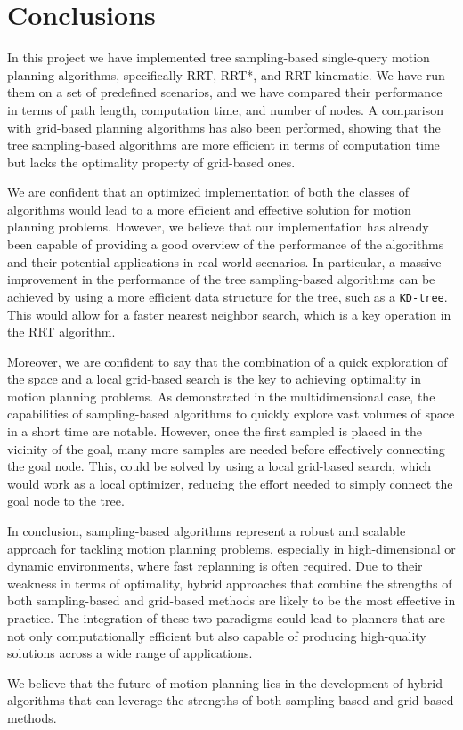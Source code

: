 \section{Conclusions}
\label{sec:conclusions}

In this project we have implemented tree sampling-based single-query motion planning algorithms, specifically RRT, RRT*, and RRT-kinematic.
We have run them on a set of predefined scenarios, and we have compared their performance in terms of path length, computation time, and number of nodes.
A comparison with grid-based planning algorithms has also been performed, showing that the tree sampling-based algorithms are more efficient in terms of computation time but lacks the optimality property of grid-based ones.

We are confident that an optimized implementation of both the classes of algorithms would lead to a more efficient and effective solution for motion planning problems.
However, we believe that our implementation has already been capable of providing a good overview of the performance of the algorithms and their potential applications in real-world scenarios.
In particular, a massive improvement in the performance of the tree sampling-based algorithms can be achieved by using a more efficient data structure for the tree, such as a \texttt{KD-tree}.
This would allow for a faster nearest neighbor search, which is a key operation in the RRT algorithm.

Moreover, we are confident to say that the combination of a quick exploration of the space and a local grid-based search is the key to achieving optimality in motion planning problems.
As demonstrated in the multidimensional case, the capabilities of sampling-based algorithms to quickly explore vast volumes of space in a short time are notable.
However, once the first sampled is placed in the vicinity of the goal, many more samples are needed before effectively connecting the goal node.
This, could be solved by using a local grid-based search, which would work as a local optimizer, reducing the effort needed to simply connect the goal node to the tree.

In conclusion, sampling-based algorithms represent a robust and scalable approach for tackling motion planning problems, especially in high-dimensional or dynamic environments, where fast replanning is often required.
Due to their weakness in terms of optimality, hybrid approaches that combine the strengths of both sampling-based and grid-based methods are likely to be the most effective in practice.
The integration of these two paradigms could lead to planners that are not only computationally efficient but also capable of producing high-quality solutions across a wide range of applications.

We believe that the future of motion planning lies in the development of hybrid algorithms that can leverage the strengths of both sampling-based and grid-based methods.